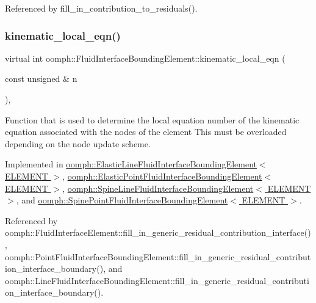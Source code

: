Referenced by fill\+\_\+in\+\_\+contribution\+\_\+to\+\_\+residuals().

\mbox{\label{classoomph_1_1FluidInterfaceBoundingElement_a12a0a6d7c3c1c1a5a0f42a57e60eab34}} 
\subsubsection{\texorpdfstring{kinematic\+\_\+local\+\_\+eqn()}{kinematic\_local\_eqn()}}
{\footnotesize\ttfamily virtual int oomph\+::\+Fluid\+Interface\+Bounding\+Element\+::kinematic\+\_\+local\+\_\+eqn (\begin{DoxyParamCaption}\item[{const unsigned \&}]{n }\end{DoxyParamCaption})\hspace{0.3cm}{\ttfamily [protected]}, {}}



Function that is used to determine the local equation number of the kinematic equation associated with the nodes of the element This must be overloaded depending on the node update scheme. 



Implemented in \hyperlink{classoomph_1_1ElasticLineFluidInterfaceBoundingElement_a0f3d4bdd756165d6a2225f5b13eac005}{oomph\+::\+Elastic\+Line\+Fluid\+Interface\+Bounding\+Element$<$ E\+L\+E\+M\+E\+N\+T $>$}, \hyperlink{classoomph_1_1ElasticPointFluidInterfaceBoundingElement_ac3d7ce3db705bee219bf56cbb0d9ba92}{oomph\+::\+Elastic\+Point\+Fluid\+Interface\+Bounding\+Element$<$ E\+L\+E\+M\+E\+N\+T $>$}, \hyperlink{classoomph_1_1SpineLineFluidInterfaceBoundingElement_a0c31dba3e151540261753679b431b04a}{oomph\+::\+Spine\+Line\+Fluid\+Interface\+Bounding\+Element$<$ E\+L\+E\+M\+E\+N\+T $>$}, and \hyperlink{classoomph_1_1SpinePointFluidInterfaceBoundingElement_a7c1c2f31b1d9f9c925889ad199a78947}{oomph\+::\+Spine\+Point\+Fluid\+Interface\+Bounding\+Element$<$ E\+L\+E\+M\+E\+N\+T $>$}.



Referenced by oomph\+::\+Fluid\+Interface\+Element\+::fill\+\_\+in\+\_\+generic\+\_\+residual\+\_\+contribution\+\_\+interface(), oomph\+::\+Point\+Fluid\+Interface\+Bounding\+Element\+::fill\+\_\+in\+\_\+generic\+\_\+residual\+\_\+contribution\+\_\+interface\+\_\+boundary(), and oomph\+::\+Line\+Fluid\+Interface\+Bounding\+Element\+::fill\+\_\+in\+\_\+generic\+\_\+residual\+\_\+contribution\+\_\+interface\+\_\+boundary().

